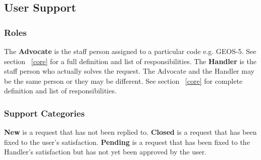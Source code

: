 \subsection{User Support}
\label{sec:usr_support}


\subsubsection{Roles}
The {\bf Advocate} is the staff person assigned to a particular code e.g. GEOS-5. See section ~\ref{core} for a full definition and list of responsibilities. 
The {\bf Handler} is the staff person who actually solves the request. The Advocate and the Handler may be the same person or they may be different. See section ~\ref{core} for complete definition and list of responsibilities.

\subsubsection{Support Categories}
{\bf New} is a request that has not been replied to.
{\bf Closed} is a request that has been fixed to the user's satisfaction.
{\bf Pending} is a request that has been fixed to the Handler's satisfaction but has not yet been approved by the user.


